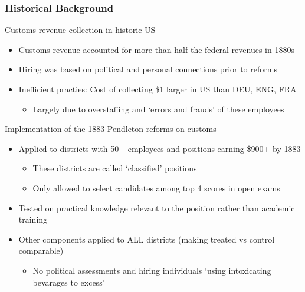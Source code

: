 \documentclass[aspectratio=169]{beamer}
\begin{document}
\begin{frame}
\frametitle{Historical Background}
Customs revenue collection in historic US
\begin{itemize}\setlength\itemsep{3pt}
\item Customs revenue accounted for more than half the federal revenues in 1880s
\item Hiring was based on political and personal connections prior to reforms
\item Inefficient practies: Cost of collecting \$1 larger in US than DEU, ENG, FRA 
\begin{itemize}\setlength\itemsep{3pt}
\item Largely due to overstaffing and `errors and frauds' of these employees
\end{itemize}
\end{itemize}\medskip
Implementation of the 1883 Pendleton reforms on customs
\begin{itemize}\setlength\itemsep{3pt}
\item Applied to districts with 50+ employees and positions earning \$900+ by 1883
  \begin{itemize}\setlength\itemsep{3pt}
\item These districts are called `classified' positions
\item Only allowed to select candidates among top 4 scores in open exams
\end{itemize}
\item Tested on practical knowledge relevant to the position rather than academic training
\item Other components applied to ALL districts (making treated vs control comparable)
  \begin{itemize}\setlength\itemsep{3pt}
\item No political assessments and hiring individuals `using intoxicating bevarages to excess'
\end{itemize}
\end{itemize}\medskip
\end{frame}
\end{document}
